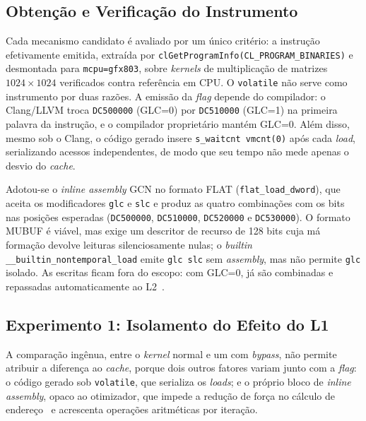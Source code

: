 \documentclass[12pt]{article}
\begin{document}
\subsection{Obtenção e Verificação do Instrumento}
\label{sec:met-multi}
\label{sec:multi}

Cada mecanismo candidato é avaliado por um único critério: a instrução
efetivamente emitida, extraída por \texttt{clGetProgramInfo(CL\_PROGRAM\_BINARIES)}
e desmontada para \texttt{mcpu=gfx803}, sobre \textit{kernels} de multiplicação de
matrizes $1024 \times 1024$ verificados contra referência em CPU. O
\texttt{volatile} não serve como instrumento por duas razões. A emissão da
\textit{flag} depende do compilador: o Clang/LLVM troca \texttt{DC500000} (GLC=0)
por \texttt{DC510000} (GLC=1) na primeira palavra da instrução, e o compilador
proprietário mantém GLC=0. Além disso, mesmo sob o Clang, o código gerado insere
\texttt{s\_waitcnt vmcnt(0)} após cada \textit{load}, serializando acessos
independentes, de modo que seu tempo não mede apenas o desvio do \textit{cache}.

Adotou-se o \textit{inline assembly} GCN no formato FLAT
(\texttt{flat\_load\_dword}), que aceita os modificadores \texttt{glc} e
\texttt{slc} e produz as quatro combinações com os bits nas posições esperadas
(\texttt{DC500000}, \texttt{DC510000}, \texttt{DC520000} e \texttt{DC530000}). O
formato MUBUF é viável, mas exige um descritor de recurso de 128 bits cuja má
formação devolve leituras silenciosamente nulas; o \textit{builtin}
\texttt{\_\_builtin\_nontemporal\_load} emite \texttt{glc slc} sem
\textit{assembly}, mas não permite \texttt{glc} isolado. As escritas ficam fora
do escopo: com GLC=0, já são combinadas e repassadas automaticamente ao
L2~\cite[Seção~8.1.9]{amdgcn3}.

\subsection{Experimento 1: Isolamento do Efeito do L1}
\label{sec:met-fatorial}

A comparação ingênua, entre o \textit{kernel} normal e um com \textit{bypass}, não permite atribuir a diferença ao \textit{cache}, porque dois outros fatores variam junto com a \textit{flag}: o código gerado sob \texttt{volatile}, que serializa os \textit{loads}; e o próprio bloco de \textit{inline assembly}, opaco ao otimizador, que impede a redução de força no cálculo de endereço~\cite{cooper2001} e acrescenta operações aritméticas por iteração.
\end{document}
